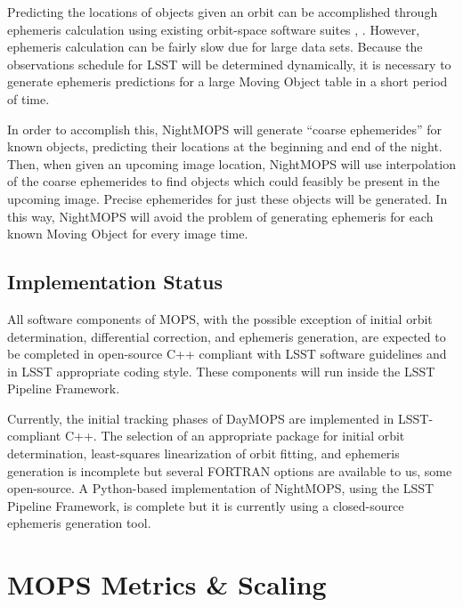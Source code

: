 \documentclass[12pt,preprint]{aastex}
\begin{document}
Predicting the locations of objects given an orbit can be accomplished
through ephemeris calculation using existing orbit-space software
suites \citep{Milani2006}, \citep{OpenOrb2009}.  However, ephemeris
calculation can be fairly slow due for large data sets.  Because the
observations schedule for LSST will be determined dynamically, it is
necessary to generate ephemeris predictions for a large Moving Object
table in a short period of time.


In order to accomplish this, NightMOPS will generate ``coarse
ephemerides'' for known objects, predicting their locations at the
beginning and end of the night.  Then, when given an upcoming image
location, NightMOPS will use interpolation of the coarse ephemerides
to find objects which could feasibly be present in the upcoming
image. Precise ephemerides for just these objects will be
generated. In this way, NightMOPS will avoid the problem of generating
ephemeris for each known Moving Object for every image time.


\subsection{Implementation Status}

All software components of MOPS, with the possible exception of
initial orbit determination, differential correction, and ephemeris
generation, are expected to be completed in open-source C++ compliant
with LSST software guidelines and in LSST appropriate coding style.
These components will run inside the LSST Pipeline Framework.

Currently, the initial tracking phases of DayMOPS are implemented in
LSST-compliant C++.  The selection of an appropriate package for
initial orbit determination, least-squares linearization of orbit
fitting, and ephemeris generation is incomplete but several FORTRAN
options are available to us, some open-source.  A Python-based
implementation of NightMOPS, using the LSST Pipeline Framework, is
complete but it is currently using a closed-source ephemeris
generation tool.




\section{MOPS Metrics \& Scaling}
\end{document}
